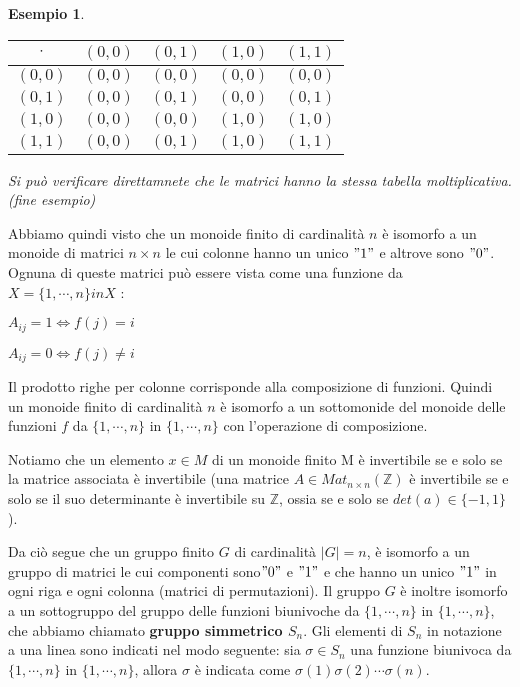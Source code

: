\documentclass[a4paper,12pt]{article}
\theoremstyle{def}
\theoremstyle{prop}
\theoremstyle{esempio}
\newtheorem*{example}{Esempio}
\theoremstyle{dimostrazione}
\theoremstyle{teo}
\theoremstyle{osservazione}
\begin{document}
\begin{example}
    \begin{table}[htbp]
        \centering
        \begin{tabular}{|c|c|c|c|c|}
            \hline
            \(\cdot\) & \((0,0)\) & \((0,1)\) & \((1,0)\) & \((1,1)\) \\ \hline
            \((0,0)\) & \((0,0)\) & \((0,0)\) & \((0,0)\) & \((0,0)\) \\ \hline
            \((0,1)\) & \((0,0)\) & \((0,1)\) & \((0,0)\) & \((0,1)\) \\ \hline
            \((1,0)\) & \((0,0)\) & \((0,0)\) & \((1,0)\) & \((1,0)\) \\ \hline
            \((1,1)\) & \((0,0)\) & \((0,1)\) & \((1,0)\) & \((1,1)\) \\ \hline
        \end{tabular}
    \end{table}
    Si può verificare direttamnete che le matrici hanno la stessa tabella moltiplicativa. (fine esempio)
\end{example}

Abbiamo quindi visto che un monoide finito di cardinalità \(n\) è isomorfo a un monoide di matrici \(n \times n\)
le cui colonne hanno un unico \("1"\) e altrove sono \("0"\).\newline
Ognuna di queste matrici può essere vista come una funzione da \(X = \{1,\cdots,n\} in X\) :\newline
\begin{center}
    \(A_{ij} = 1 \Leftrightarrow f(j) = i\)
\end{center}
\begin{center}
    \(A_{ij} = 0 \Leftrightarrow f(j) \neq i\)
\end{center}
Il prodotto righe per colonne corrisponde alla composizione di funzioni.\newline
Quindi un monoide finito di cardinalità \(n\) è isomorfo a un sottomonide del monoide delle funzioni
\(f\) da \(\{1,\cdots,n\}\) in \(\{1,\cdots,n\}\) con l'operazione di composizione.

Notiamo che un elemento \(x \in M\) di un monoide finito M è invertibile se e solo se la matrice associata è
invertibile (una matrice \(A \in Mat_{n \times n} (\mathbb{Z})\) è invertibile se e solo se il suo determinante è
invertibile su \(\mathbb{Z}\), ossia se e solo se \(det(a) \in \{-1,1\}\)).

Da ciò segue che un gruppo finito \(G\) di cardinalità \(|G|=n\), è isomorfo a un gruppo di matrici le cui componenti
sono\("0"\) e \("1"\) e che hanno un unico \("1"\) in ogni riga e ogni colonna (matrici di permutazioni). \newline
Il gruppo \(G\) è inoltre isomorfo a un sottogruppo del gruppo delle funzioni biunivoche da \(\{1,\cdots,n\}\) in \(\{1,\cdots,n\}\),
che abbiamo chiamato \textbf{gruppo simmetrico \(S_n\)}. \newline
Gli elementi di \(S_n\) in notazione a una linea sono indicati nel modo seguente: sia
\(\sigma \in S_n\) una funzione biunivoca da \(\{1,\cdots,n\}\) in \(\{1,\cdots,n\}\), allora \(\sigma\) è indicata come
\(\sigma(1)\sigma(2)\cdots\sigma(n)\).
\end{document}
